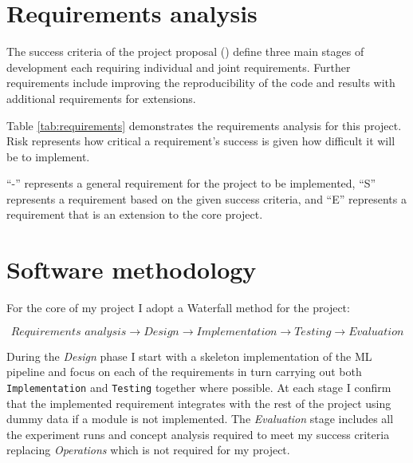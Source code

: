 \section{Requirements analysis}


The success criteria of the project proposal () define three main stages of development each requiring individual and joint requirements.
Further requirements include improving the reproducibility of the code and results with additional requirements for extensions.

Table \ref{tab:requirements} demonstrates the requirements analysis for this project.
Risk represents how critical a requirement's success is given how difficult it will be to implement.

``-'' represents a general requirement for the project to be implemented, ``S'' represents a requirement based on the given success criteria, and ``E'' represents a requirement that is an extension to the core project.



\section{Software methodology}


For the core of my project I adopt a Waterfall method \cite{royce1970managing} for the project:

\begin{equation*}
    \textit{Requirements analysis} \longrightarrow \textit{Design} \longrightarrow \textit{Implementation} \longrightarrow \textit{Testing} \longrightarrow \textit{Evaluation}
\end{equation*}

During the \textit{Design} phase I start with a skeleton implementation of the ML pipeline and focus on each of the requirements in turn carrying out both \texttt{Implementation} and \texttt{Testing} together where possible.
At each stage I confirm that the implemented requirement integrates with the rest of the project using dummy data if a module is not implemented.
The \textit{Evaluation} stage includes all the experiment runs and concept analysis required to meet my success criteria replacing \textit{Operations} which is not required for my project.

